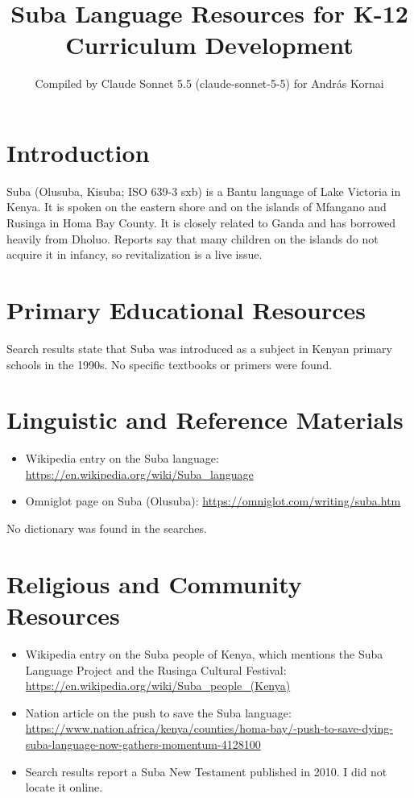 \documentclass[12pt]{article}
\title{Suba Language Resources for K-12 Curriculum Development}
\author{Compiled by Claude Sonnet 5.5 (claude-sonnet-5-5) for Andr\'as Kornai}
\date{}
\begin{document}
\maketitle

\section{Introduction}
Suba (Olusuba, Kisuba; ISO 639-3 sxb) is a Bantu language of Lake Victoria in Kenya. It is spoken on the eastern shore and on the islands of Mfangano and Rusinga in Homa Bay County. It is closely related to Ganda and has borrowed heavily from Dholuo. Reports say that many children on the islands do not acquire it in infancy, so revitalization is a live issue.

\section{Primary Educational Resources}
Search results state that Suba was introduced as a subject in Kenyan primary schools in the 1990s. No specific textbooks or primers were found.

\section{Linguistic and Reference Materials}
\begin{itemize}
\item Wikipedia entry on the Suba language: \url{https://en.wikipedia.org/wiki/Suba_language}
\item Omniglot page on Suba (Olusuba): \url{https://omniglot.com/writing/suba.htm}
\end{itemize}
No dictionary was found in the searches.

\section{Religious and Community Resources}
\begin{itemize}
\item Wikipedia entry on the Suba people of Kenya, which mentions the Suba Language Project and the Rusinga Cultural Festival: \url{https://en.wikipedia.org/wiki/Suba_people_(Kenya)}
\item Nation article on the push to save the Suba language: \url{https://www.nation.africa/kenya/counties/homa-bay/-push-to-save-dying-suba-language-now-gathers-momentum-4128100}
\item Search results report a Suba New Testament published in 2010. I did not locate it online.
\end{itemize}
\end{document}
